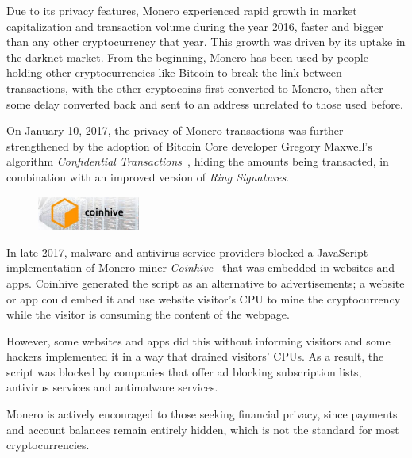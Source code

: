 Due to its privacy features, Monero experienced rapid growth in market capitalization and transaction volume during the year 2016, faster and bigger than any other cryptocurrency that year. This growth was driven by its uptake in the darknet market. From the beginning, Monero has been used by people holding other cryptocurrencies like \hyperref[sec:Bitcoin]{Bitcoin} to break the link between transactions, with the other cryptocoins first converted to Monero, then after some delay converted back and sent to an address unrelated to those used before.

On January 10, 2017, the privacy of Monero transactions was further strengthened by the adoption of Bitcoin Core developer Gregory Maxwell's algorithm \emph{Confidential Transactions}~\cite{ringCT}, hiding the amounts being transacted, in combination with an improved version of \emph{Ring Signatures}.

\begin{figure}
\centering
\includegraphics[width=0.3\textwidth]{Images/Monero/coinhive.jpg}
\end{figure}
In late 2017, malware and antivirus service providers blocked a JavaScript implementation of Monero miner \emph{Coinhive}~\cite{coinhive} that was embedded in websites and apps. Coinhive generated the script as an alternative to advertisements; a website or app could embed it and use website visitor's CPU to mine the cryptocurrency while the visitor is consuming the content of the webpage.

However, some websites and apps did this without informing visitors and some hackers implemented it in a way that drained visitors' CPUs. As a result, the script was blocked by companies that offer ad blocking subscription lists, antivirus services and antimalware services.

Monero is actively encouraged to those seeking financial privacy, since payments and account balances remain entirely hidden, which is not the standard for most cryptocurrencies.

